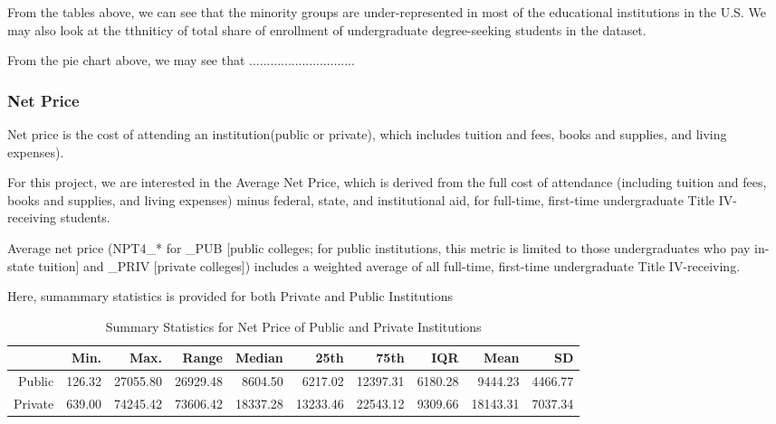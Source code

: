 \documentclass{article}\usepackage[]{graphicx}\usepackage[]{color}
\makeatletter
\newenvironment{kframe}{%
 \def\at@end@of@kframe{}%
 \ifinner\ifhmode%
  \def\at@end@of@kframe{\end{minipage}}%
  \begin{minipage}{\columnwidth}%
 \fi\fi%
 \def\FrameCommand##1{\hskip\@totalleftmargin \hskip-\fboxsep
 \colorbox{shadecolor}{##1}\hskip-\fboxsep
     \hskip-\linewidth \hskip-\@totalleftmargin \hskip\columnwidth}%
 \MakeFramed {\advance\hsize-\width
   \@totalleftmargin\z@ \linewidth\hsize
   \@setminipage}}%
 {\par\unskip\endMakeFramed%
 \at@end@of@kframe}
\newenvironment{knitrout}{}{} %
\makeatother
\begin{document}
From the tables above, we can see that the minority groups are under-represented in most of the educational institutions in the U.S. We may also look at the tthniticy of total share of enrollment of undergraduate degree-seeking students in the dataset.

\begin{knitrout}
\color{fgcolor}\begin{kframe}


{\ttfamily\noindent\bfseries\color{errorcolor}{\#\# Error: 'include\_graphics' is not an exported object from 'namespace:knitr'}}\end{kframe}
\end{knitrout}

From the pie chart above, we may see that ..............................

\subsubsection{Net Price}
Net price is the cost of attending an institution(public or private), which includes tuition and fees, books and supplies, and living expenses).

For this project, we are interested in the Average Net Price,  which is derived from the full cost of attendance (including tuition and fees, books and supplies, and living expenses) minus federal, state, and institutional aid, for full-time, first-time undergraduate Title IV-receiving students. 

Average net price (NPT4_* for _PUB [public colleges; for
public institutions, this metric is limited to those undergraduates who pay in-state tuition] and _PRIV [private colleges]) includes a weighted
average of all full-time, first-time undergraduate Title IV-receiving. 


Here, sumammary statistics is provided for both Private and Public Institutions
\begin{table}[ht]
\centering
\begin{tabular}{rrrrrrrrrr}
  \hline
 & Min. & Max. & Range & Median & 25th & 75th & IQR & Mean & SD \\ 
  \hline
Public & 126.32 & 27055.80 & 26929.48 & 8604.50 & 6217.02 & 12397.31 & 6180.28 & 9444.23 & 4466.77 \\ 
  Private & 639.00 & 74245.42 & 73606.42 & 18337.28 & 13233.46 & 22543.12 & 9309.66 & 18143.31 & 7037.34 \\ 
   \hline
\end{tabular}
\caption{Summary Statistics for Net Price of Public and Private Institutions} 
\end{table}
\end{document}
